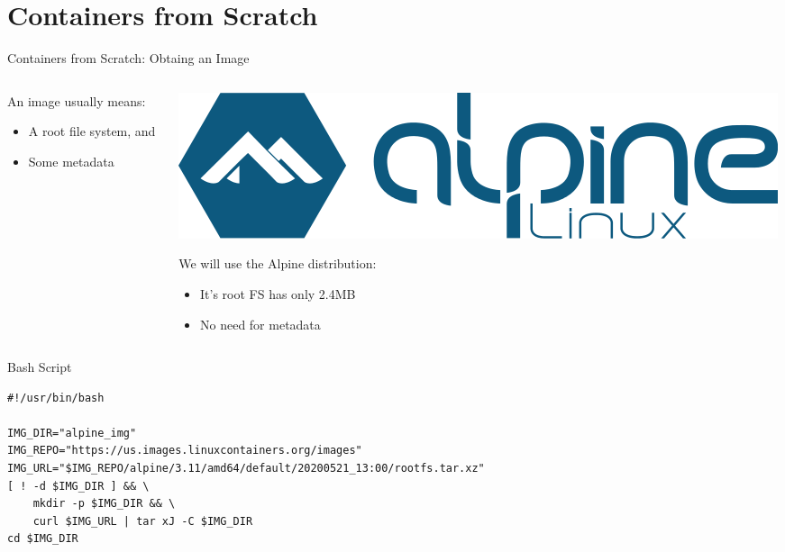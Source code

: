 \documentclass[10pt, compress, aspectratio=169, xcolor={table,usenames,dvipsnames}]{beamer}
\begin{document}
\section{Containers from Scratch}
\label{sec:org600eb09}
\begin{frame}[label={sec:org741680d},fragile]{Containers from Scratch: Obtaing an Image}
 \begin{columns}
\begin{column}{0.5\columnwidth}
An \alert{image} usually means:

\begin{itemize}
\item A \alert{root} file system, and
\item Some \alert{metadata}
\end{itemize}
\end{column}
\begin{column}{0.5\columnwidth}
\begin{center}
\includegraphics[width=.5\columnwidth]{../../img/alpine_linux.png}
\end{center}

We will use the \alert{Alpine} distribution:
\begin{itemize}
\item It's root FS has only \alert{2.4MB}
\item No need for metadata
\end{itemize}
\end{column}
\end{columns}

\begin{block}{Bash Script}
\lstset{language=bash,label= ,caption= ,captionpos=b,numbers=none}
\begin{lstlisting}
#!/usr/bin/bash

IMG_DIR="alpine_img"
IMG_REPO="https://us.images.linuxcontainers.org/images"
IMG_URL="$IMG_REPO/alpine/3.11/amd64/default/20200521_13:00/rootfs.tar.xz"
[ ! -d $IMG_DIR ] && \
    mkdir -p $IMG_DIR && \
    curl $IMG_URL | tar xJ -C $IMG_DIR
cd $IMG_DIR
\end{lstlisting}
\end{block}
\end{frame}
\end{document}
